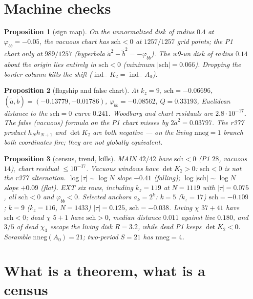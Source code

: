 \documentclass[11pt]{article}
\newtheorem{prop}{Proposition}
\theoremstyle{remark}
\newcommand{\indm}{\operatorname{ind}_{-}}
\newcommand{\sch}{\mathrm{sch}}
\begin{document}
\section{Machine checks}\label{sec:prop}

\begin{prop}[sign map]\label{prop:map}
On the unnormalized disk of radius $0.4$ at $\varphi_{bb}=-0.05$,
the vacuous chart has $\sch<0$ at $1257/1257$ grid points;
the P1 chart only at $989/1257$ (hyperbola
$\tilde a^{2}-\tilde b^{2}=-\varphi_{bb}$).
The w9-un disk of radius $0.14$ about the origin lies entirely
in $\sch<0$ (minimum $|\sch|=0.066$).
Dropping the border column kills the shift
($\indm K_{2}=\indm A_{0}$).
\end{prop}

\begin{prop}[flagship and false chart]\label{prop:w9}
At $k_{z}=9$, $\sch=-0.06696$,
$(\tilde a,\tilde b)=(-0.13779,-0.01786)$,
$\varphi_{bb}=-0.08562$, $Q=0.33193$, Euclidean distance to
the $\sch=0$ curve $0.241$.
Woodbury and chart residuals are $2.8\cdot 10^{-17}$.
The false (vacuous) formula on the P1 chart misses by
$2\tilde a^{2}=0.03797$.
The r377 product $h_{N}h_{N+1}$ and $\det K_{2}$ are both
negative --- on the living $\mathrm{nneg}=1$ branch both
coordinates fire; they are not globally equivalent.
\end{prop}

\begin{prop}[census, trend, kills]\label{prop:census}
MAIN $42/42$ have $\sch<0$ (P1 $28$, vacuous $14$), chart
residual $\le 10^{-17}$.
Vacuous windows have $\det K_{2}>0$: $\sch<0$ is not the
r377 alternation.  $\log|\tau|\sim\log N$ slope $-0.41$
(falling); $\log|\sch|\sim\log N$ slope $+0.09$ (flat).
EXT six rows, including $k_{z}=119$ at $N=1119$ with
$|\tau|=0.075$, all $\sch<0$ and $\varphi_{bb}<0$.
Selected anchors $a_{k}=2^{k}$: $k=5$ ($k_{z}=17$)
$\sch=-0.109$; $k=9$ ($k_{z}=116$, $N=1433$)
$|\tau|=0.125$, $\sch=-0.038$.
Living $\chi$ $37+41$ have $\sch<0$; dead $\chi$ $5+1$ have
$\sch>0$, median distance $0.011$ against live $0.180$,
and $3/5$ of dead $\chi_{3}$ escape the living disk $R=3.2$,
while dead P1 keeps $\det K_{2}<0$.
Scramble $\mathrm{nneg}(A_{0})=21$; two-period $S=21$ has
$\mathrm{nneg}=4$.
\end{prop}

\section{What is a theorem, what is a census}\label{sec:honest}
\end{document}
